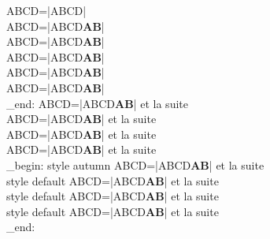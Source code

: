 %
\makeatletter
\makeatother

ABCD=\CDRCode|ABCD|\\
ABCD=\CDRCode|ABCD\textbf{AB}|\\
ABCD=\CDRCode[fontfamily=menlo]|ABCD\textbf{AB}|\\
ABCD=\CDRCode[formatcom=\color{red}]|ABCD\textbf{AB}|\\
ABCD=\CDRCode[format=\color{blue}]|ABCD\textbf{AB}|\\
ABCD=\CDRCode[format=\color{blue},formatcom=\color{red}]|ABCD\textbf{AB}|\\

\group_end:
\ExplSyntaxOff
{}
ABCD=\CDRCode|ABCD\textbf{AB}| et la suite\\
ABCD=\CDRCode[style=autumn]|ABCD\textbf{AB}| et la suite\\
ABCD=\CDRCode[cache=true]|ABCD\textbf{AB}| et la suite\\
ABCD=\CDRCode[cache=true,debug=true]|ABCD\textbf{AB}| et la suite\\
\ExplSyntaxOn
\group_begin:
\ExplSyntaxOff
{}
style autumn  ABCD=\CDRCode[tag=X]|ABCD\textbf{AB}| et la suite\\
style default ABCD=\CDRCode[tag=Y]|ABCD\textbf{AB}| et la suite\\
style default ABCD=\CDRCode[engine=efbox, efbox engine options={hidealllines,backgroundcolor=red}, engine options={backgroundcolor=yellow}]|ABCD\textbf{AB}| et la suite\\
style default ABCD=\CDRCode[format=\color{blue}]|ABCD\textbf{AB}| et la suite\\
\ExplSyntaxOn
\group_end:
\ExplSyntaxOff
{}
